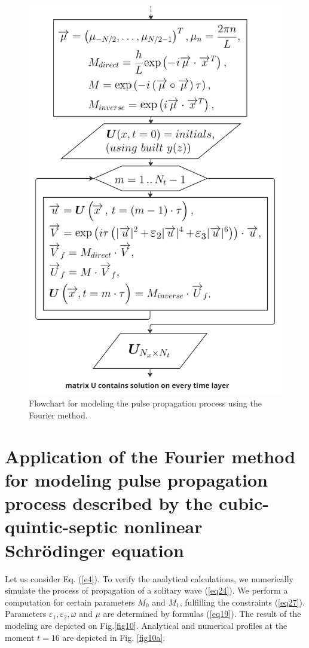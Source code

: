 \documentclass[preprint,12pt]{elsarticle}
\begin{document}
\begin{figure}[H]
\begin{center}
\begin{minipage}[h]{0.48\linewidth}
\includegraphics[width=0.75\linewidth]{fig3.png}
\end{minipage}
\end{center}
\caption{Flowchart for modeling the pulse propagation process using the Fourier method.}
\label{fig2}
\end{figure}

\section{Application of the Fourier method for modeling pulse propagation process described by the cubic-quintic-septic nonlinear Schr\"{o}dinger equation}\label{ch6}
Let us consider Eq. (\ref{e4}). To verify the analytical calculations, we numerically simulate the process of propagation of a solitary wave (\ref{eq24}). We perform a computation for certain parameters \(M_{0}\) and \(M_{1}\), fulfilling the constraints (\ref{eq27}). Parameters \(\varepsilon_{1}\),\,\(\varepsilon_{2}\),\,\(\omega\) and \(\mu\) are determined by formulas (\ref{eq19}). The result of the modeling are depicted on Fig.\ref{fig10}. Analytical and numerical profiles at the moment \(t=16\) are depicted in Fig. \ref{fig10a}.
\end{document}
